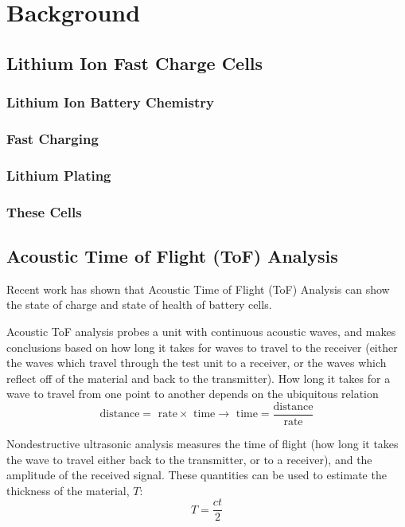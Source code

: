 \chapter{Background}

\section{Lithium Ion Fast Charge Cells}

\subsection{Lithium Ion Battery Chemistry}

\subsection{Fast Charging}

\subsection{Lithium Plating}

\subsection{These Cells}


\section{Acoustic Time of Flight (ToF) Analysis}
Recent work has shown that Acoustic Time of Flight (ToF) Analysis can show the state of charge and state of health of battery cells.

Acoustic ToF analysis probes a unit with continuous acoustic waves, and makes conclusions based on how long it takes for waves to travel to the receiver (either the waves which travel through the test unit to a receiver, or the waves which reflect off of the material and back to the transmitter). How long it takes for a wave to travel from one point to another depends on the ubiquitous relation 
$$\text{distance} = \text{ rate} \times \text{ time} \rightarrow \text{ time} = \frac{\text{distance}}{\text{rate}}$$

Nondestructive ultrasonic analysis measures the time of flight (how long it takes the wave to travel either back to the transmitter, or to a receiver), and the amplitude of the received signal. These quantities can be used to estimate the thickness of the material, $T$:
$$ T = \frac{ct}{2}$$

